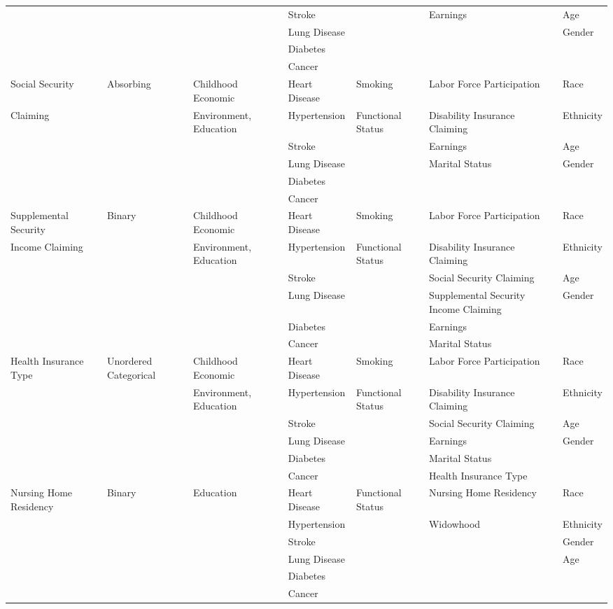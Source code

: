 \begin{table}
\begin{scriptsize}
\begin{tabular}{lllllll}
& & & Stroke & & Earnings & Age \\
& & & Lung Disease &   &  & Gender \\
& & & Diabetes &  &  &  \\
& & & Cancer &  & & \\
\midrule			
Social Security  & Absorbing & Childhood Economic & Heart Disease & Smoking & Labor Force Participation & Race \\
Claiming & & Environment, Education & Hypertension & Functional Status & Disability Insurance Claiming  & Ethnicity \\
& & & Stroke & & Earnings & Age \\
& & & Lung Disease &   & Marital Status & Gender \\
& & & Diabetes &  &  &  \\
& & & Cancer &  & & \\
\midrule			
Supplemental Security & Binary & Childhood Economic  & Heart Disease & Smoking & Labor Force Participation & Race \\
Income Claiming  & & Environment, Education & Hypertension & Functional Status & Disability Insurance Claiming  & Ethnicity \\
& & & Stroke & & Social Security Claiming & Age \\
& & & Lung Disease &   & Supplemental Security Income Claiming  & Gender \\
& & & Diabetes &  & Earnings &  \\
& & & Cancer &  & Marital Status & \\
\midrule			
Health Insurance Type & Unordered Categorical & Childhood Economic & Heart Disease & Smoking & Labor Force Participation & Race \\
& & Environment, Education & Hypertension & Functional Status & Disability Insurance Claiming  & Ethnicity \\
& & & Stroke & & Social Security Claiming & Age \\
& & & Lung Disease &   & Earnings & Gender \\
& & & Diabetes &  & Marital Status &  \\
& & & Cancer &  & Health Insurance Type & \\
\midrule
Nursing Home Residency & Binary & Education & Heart Disease & Functional Status & Nursing Home Residency & Race \\
& & & Hypertension & & Widowhood & Ethnicity \\
& & & Stroke & &   & Gender \\
& & & Lung Disease  & & & Age \\
&  & & Diabetes & & & \\
&  & & Cancer & & & \\
\bottomrule
\end{tabular}
\end{scriptsize}
\end{table}

